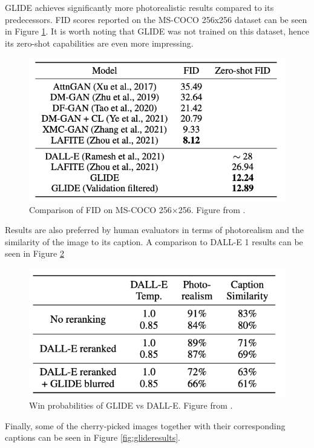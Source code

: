 \documentclass[
]{krantz}
\begin{document}
GLIDE achieves significantly more photorealistic results compared to its predecessors. FID scores reported on the MS-COCO 256x256 dataset can be seen in Figure \ref{fig:glidefid}. It is worth noting that GLIDE was not trained on this dataset, hence its zero-shot capabilities are even more impressing.

\begin{figure}

{\centering \includegraphics[width=0.6\linewidth]{figures/02-02-text-2-img/glidefid} 

}

\caption{Comparison of FID on MS-COCO 256×256. Figure from \citet{Glide2021}.}\label{fig:glidefid}
\end{figure}



Results are also preferred by human evaluators in terms of photorealism and the similarity of the image to its caption. A comparison to DALL-E 1 results can be seen in Figure \ref{fig:gliderealism}

\begin{figure}

{\centering \includegraphics[width=0.6\linewidth]{figures/02-02-text-2-img/gliderealism} 

}

\caption{Win probabilities of GLIDE vs DALL-E. Figure from \citet{Glide2021}.}\label{fig:gliderealism}
\end{figure}



Finally, some of the cherry-picked images together with their corresponding captions can be seen in Figure \ref{fig:glideresults}.
\end{document}
